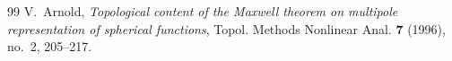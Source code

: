 \documentclass[10pt,a4paper]{amsart}
\begin{document}
\begin{thebibliography}{99}
 V.~Arnold, \emph{Topological content of the {M}axwell theorem on multipole representation of spherical functions}, Topol. Methods Nonlinear Anal. \textbf{7} (1996), no.~2, 205--217.
\end{thebibliography}
\end{document}
